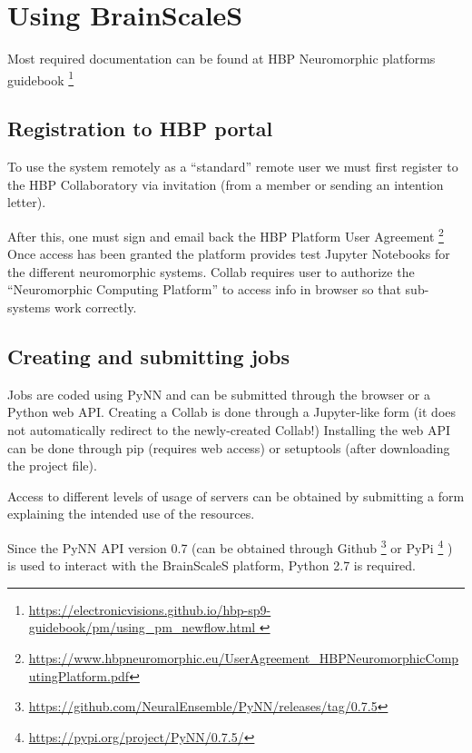 \documentclass[11pt,a4paper]{article}
\begin{document}

 \section{Using BrainScaleS}
 
 Most required documentation can be found at HBP Neuromorphic platforms guidebook
 \footnote{
   \url{
     https://electronicvisions.github.io/hbp-sp9-guidebook/pm/using_pm_newflow.html
   }
 }
 
 \subsection{Registration to HBP portal}
 To use the system remotely as a ``standard'' remote user we must first register to the HBP Collaboratory via invitation (from a member or sending an intention letter).
 
 After this, one must sign and email back the HBP Platform User  Agreement
 \footnote{
  \url{https://www.hbpneuromorphic.eu/UserAgreement_HBPNeuromorphicComputingPlatform.pdf}
 }
 Once access has been granted the platform provides test Jupyter Notebooks for the different neuromorphic systems. 
 Collab requires user to authorize the ``Neuromorphic Computing Platform'' to access info in browser so that sub-systems work correctly.
 
 \subsection{Creating and submitting jobs}
 Jobs are coded using PyNN and can be submitted through the browser or a Python web API.
 Creating a Collab is done through a Jupyter-like form (it does not automatically redirect to the newly-created Collab!)
 Installing the web API can be done through pip (requires web access) or setuptools (after downloading the project file).
 
 Access to different levels of usage of servers can be obtained by submitting a form explaining the intended use of the resources.
 
 Since the PyNN API version 0.7 (can be obtained through Github
 \footnote{\url{https://github.com/NeuralEnsemble/PyNN/releases/tag/0.7.5}} 
 or PyPi 
 \footnote{\url{https://pypi.org/project/PyNN/0.7.5/}}
 )
  is used to interact with the BrainScaleS platform, Python 2.7 is required.
 
 
\end{document}
